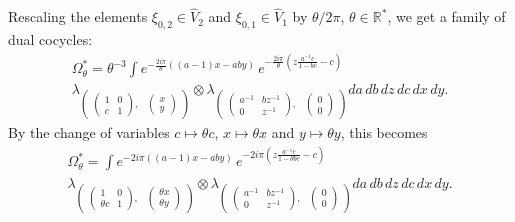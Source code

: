 \documentclass[a4paper,11pt,reqno]{amsart}
\numberwithin{equation}{section}
\theoremstyle{remark}
\theoremstyle{definition}
\newcommand{\R}{{\mathbb R}}
\begin{document}
Rescaling the elements $\xi_{0,2}\in \hat V_2$ and $\xi_{0,1}\in \hat V_1$ by  $\theta/2\pi$, $\theta\in\R^*$, we get a family of dual cocycles:
\begin{multline}
\Omega^*_\theta=\theta^{-3}\int
e^{-\frac{2i\pi}\theta((a-1)x-aby)}\,
e^{-\frac{2i\pi}\theta(z\frac{a^{-1}c}{1-bc}-c)}\\
\lambda_{\begin{pmatrix} \begin{pmatrix}1&0\\c&1\end{pmatrix},&\!\!\!\!\begin{pmatrix}x\\y\end{pmatrix}\end{pmatrix}}
\otimes\lambda_{\begin{pmatrix} \begin{pmatrix}a^{-1}&bz^{-1}\\0&z^{-1}\end{pmatrix},&\!\!\!\!\begin{pmatrix}0\\0\end{pmatrix}\end{pmatrix}}
 da\,db\,dz\,dc\,dx\,dy.
 \end{multline}
 By the change of variables $c\mapsto\theta c$, $x\mapsto\theta x$ and $y\mapsto\theta y$, this becomes
 \begin{multline*}
\Omega^*_\theta =\int
e^{-2i\pi((a-1)x-aby)}\,
e^{-2i\pi(z\frac{a^{-1}c}{1-\theta bc}-c)}\\
\lambda_{\begin{pmatrix} \begin{pmatrix}1&0\\\theta c&1\end{pmatrix},&\!\!\!\!\begin{pmatrix}\theta x\\\theta y\end{pmatrix}\end{pmatrix}}
\otimes\lambda_{\begin{pmatrix} \begin{pmatrix}a^{-1}&bz^{-1}\\0&z^{-1}\end{pmatrix},&\!\!\!\!\begin{pmatrix}0\\0\end{pmatrix}\end{pmatrix}}
 da\,db\,dz\,dc\,dx\,dy.
\end{multline*}
\end{document}
